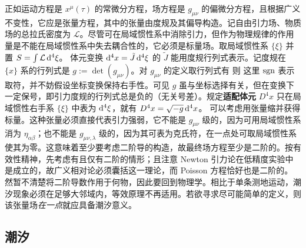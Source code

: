 正如运动方程是 $x^\mu(\tau)$ 的常微分方程，场方程是 $g_{\mu\nu}$ 的偏微分方程，且根据广义不变性，它应是张量方程，其中的张量由度规及其偏导构造。记自由引力场、物质场的总拉氏密度为 $\mathcal L$。尽管可在局域惯性系中消除引力，但作为物理规律的作用量是不能在局域惯性系中失去耦合性的，它必须是标量场。取局域惯性系 $\{\xi\}$ 并置 $S=\int \mathcal L \dd[4]{\xi}$。
体元变换 $\dd[4]x =\tilde J \dd[4]{\xi}$ 的 $\tilde J$ 能用度规行列式表示。记度规在 $\{x\}$ 系的行列式是 $g:=\det(g_{\mu\nu})$。对 $g_{\mu\nu}$ 的定义取行列式有
则
这里 $\operatorname{sgn}$ 表示取符，并不妨假设坐标变换保持右手性。可见 $g$ 虽与坐标选择有关，但在变换下一定保号，即引力度规的行列式总是负的（无关号差）。规定\textbf{适配体元} $D^4 x$ 只在局域惯性右手系 $\{\xi\}$ 中表为 $\dd[4]\xi$，就有 $D^4 x=\sqrt{-g}\dd[4]{x}$。
可以考虑用张量缩并获得标量。这种张量必须直接代表引力强弱，它不能是 $g_{\mu\nu}$ 级的，因为可用局域惯性系消为 $\eta_{\alpha\beta}$；也不能是 $g_{\mu\nu,\lambda}$ 级的，因为其可表为克氏符，在一点处可取局域惯性系使其为零。这意味着至少要考虑二阶导的构造，故最终场方程至少是二阶的。按有效性精神，先考虑有且仅有二阶的情形；且注意 Newton 引力论在低精度实验中是成立的，故广义相对论必须囊括这一理论，而 Poisson 方程恰好也是二阶的。
然暂不清楚将二阶导数作用于何物，因此要回到物理学。相比于单条测地运动，潮汐现象必须在足够大邻域内，等效原理不再适用。若欲寻求尽可能简单的定义，则该张量场\textit{在一点}就应具备潮汐意义。

\subsection{潮汐}

